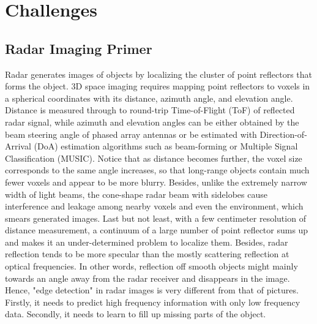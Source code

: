\section{Challenges}
\subsection{Radar Imaging Primer}
Radar generates images of objects by localizing the cluster of point reflectors that forms the object. 3D space imaging requires mapping point reflectors to voxels in a spherical coordinates with its distance, azimuth angle, and elevation angle. Distance is measured through to round-trip Time-of-Flight (ToF) of reflected radar signal, while azimuth and elevation angles can be either obtained by the beam steering angle of phased array antennas or be estimated with Direction-of-Arrival (DoA) estimation algorithms such as beam-forming or Multiple Signal Classification (MUSIC). Notice that as distance becomes further, the voxel size corresponds to the same angle increases, so that long-range objects contain much fewer voxels and appear to be more blurry. Besides, unlike the extremely narrow width of light beams, the cone-shape radar beam with sidelobes cause interference and leakage among nearby voxels and even the environment, which smears generated images. Last but not least, with a few centimeter resolution of distance measurement, a continuum of a large number of point reflector sums up and makes it an under-determined problem to localize them. Besides, radar reflection tends to be more specular than the mostly scattering reflection at optical frequencies. In other words, reflection off smooth objects might mainly towards an angle away from the radar receiver and disappears in the image. Hence, "edge detection" in radar images is very different from that of pictures. Firstly, it needs to predict high frequency information with only low frequency data. Secondly, it needs to learn to fill up missing parts of the object. 

